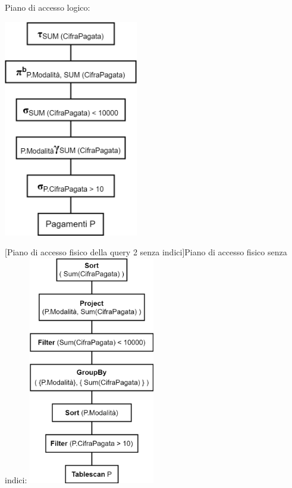 \documentclass[a4paper,12pt]{article}
\begin{document}
\vspace{-0.3cm}\begin{minipage}{\textwidth}
\begin{multicols}{2}

\null \vfill
Piano di accesso logico:

\vspace{0.3cm}\includegraphics[height=9.5cm]{ Albero logico 2.png }
\vfill \null

\columnbreak

 [Piano di accesso fisico della query 2 senza indici]{Piano di accesso fisico senza indici:}
\includegraphics[height=10cm]{ Albero fisico 2.png }
\end{multicols}
\end{minipage}
\end{document}
